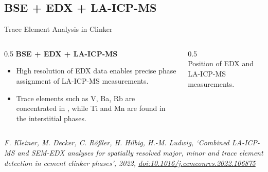 \documentclass[10pt,aspectratio=169]{beamer}
\newcommand{\doi}[1]{\href{https://doi.org/#1}{doi:#1}}
\begin{document}
\subsection{BSE + EDX + LA-ICP-MS}
\begin{frame}{Trace Element Analysis in Clinker}
  \begin{columns}
    \begin{column}{0.5\textwidth}
      \textbf{BSE + EDX + LA-ICP-MS}
      \begin{itemize}
        \item High resolution of EDX data enables precise phase assignment of LA-ICP-MS measurements.
        \item Trace elements such as V, Ba, Rb are concentrated in , while Ti and Mn are found in the interstitial phases.
      \end{itemize}
    \end{column}
    \begin{column}{0.5\textwidth}
      \centering
      \\
      \footnotesize Position of EDX and LA-ICP-MS measurements.\\

    \end{column}
  \end{columns}
   \vfill\raggedleft\tiny\itshape F. Kleiner, M. Decker, C. Rößler, H. Hilbig, H.-M. Ludwig, `Combined LA-ICP-MS and SEM-EDX analyses for spatially resolved major, minor and trace element detection in cement clinker phases', 2022, \doi{10.1016/j.cemconres.2022.106875}
\end{frame}
\end{document}
